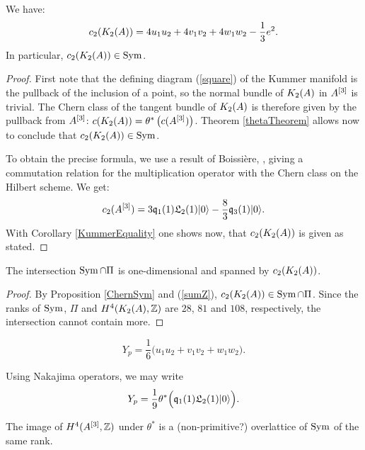 \begin{proposition} \label{ChernSym}
We have:
\begin{equation}
c_2(K_{ 2 }( A ))= 4 u_1u_2 + 4v_1v_2 + 4 w_1 w_2 - \frac{1}{3} e^2. 
\end{equation}
In particular, $c_2(K_{ 2 }( A ))\in \operatorname{Sym} $.
\end{proposition}
\begin{proof}
First note that the defining diagram (\ref{square}) of the Kummer manifold is the pullback of the inclusion of a point, so the normal bundle of $K_{ 2 }( A )$ in $A^{[3]}$ is trivial. The Chern class of the tangent bundle of $K_{ 2 }( A )$ is therefore given by the pullback from $A^{[3]}$: $c(K_{ 2 }( A )) = \theta^*\left(c(A^{[3]})\right)$. Theorem \ref{thetaTheorem} allows now to conclude that $c_2(K_{ 2 }( A ))\in \operatorname{Sym}$.

To obtain the precise formula, we use a result of Boissi\`ere, \cite[Lemma 3.12]{Boissiere}, giving a commutation relation for the multiplication operator with the Chern class on the Hilbert scheme. We get:
$$
c_2(A^{[3]}) = 3\mathfrak{q}_1(1)\mathfrak L_2(1)|0\rangle - \frac{8}{3} \mathfrak{q}_3(1)|0\rangle.
$$
With Corollary \ref{KummerEquality} one shows now, that $c_2(K_{ 2 }( A ))$ is given as stated.
\end{proof}


\begin{corollary}\label{Pi'}
The intersection $\operatorname{Sym}\cap \Pi$ is one-dimensional and spanned by $c_2(K_{ 2 }( A ))$. 
\end{corollary}
\begin{proof}
By Proposition \ref{ChernSym} and (\ref{sumZ}), $c_2(K_{ 2 }( A ))\in \operatorname{Sym}\cap \Pi$. Since the ranks of $\operatorname{Sym}$, $\Pi$ and $H^4(K_{ 2 }( A ),\mathbb{Z})$ are $28$, $81$ and $108$, respectively, the intersection cannot contain more.
\end{proof}

\begin{corollary}\label{Classuvw}
\begin{equation} \label{YSym}
Y_p =  \frac{1}{6}\Big(u_1u_2 + v_1v_2 +  w_1 w_2 \Big).
\end{equation}
\end{corollary}
\begin{remark}
Using Nakajima operators, we may write
\begin{gather}
Y_p = \frac{1}{9} \theta^*\Big( \mathfrak{q}_1(1)\mathfrak L_2(1) |0\rangle \Big).
\end{gather}

\end{remark}

\begin{proposition}
The image of $H^4(A^{[3]},\mathbb{Z})$ under $\theta^*$ is a (non-primitive?) overlattice of $\operatorname{Sym}$ of the same rank.
\end{proposition}

